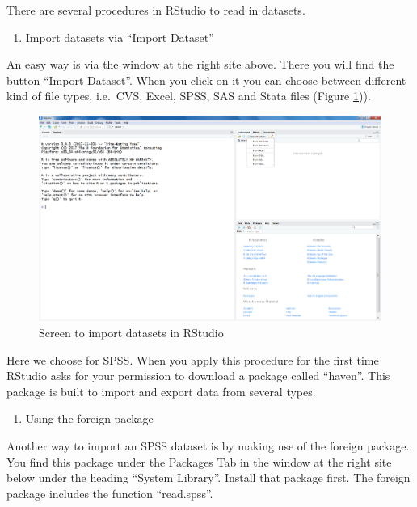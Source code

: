 \documentclass[]{book}
\providecommand{\tightlist}{%
  \setlength{\itemsep}{0pt}\setlength{\parskip}{0pt}}
\begin{document}
There are several procedures in RStudio to read in datasets.

\begin{enumerate}
\def\labelenumi{\arabic{enumi}.}
\tightlist
\item
  Import datasets via ``Import Dataset''
\end{enumerate}

An easy way is via the window at the right site above. There you will
find the button ``Import Dataset''. When you click on it you can choose
between different kind of file types, i.e.~CVS, Excel, SPSS, SAS and
Stata files (Figure \ref{fig:fig13})).

\begin{figure}

{\centering \includegraphics[width=0.95\linewidth]{images/fig1.13} 

}

\caption{Screen to import datasets in RStudio}\label{fig:fig13}
\end{figure}

Here we choose for SPSS. When you apply this procedure for the first
time RStudio asks for your permission to download a package called
``haven''. This package is built to import and export data from several
types.

\begin{enumerate}
\def\labelenumi{\arabic{enumi}.}
\setcounter{enumi}{1}
\tightlist
\item
  Using the foreign package
\end{enumerate}

Another way to import an SPSS dataset is by making use of the foreign
package. You find this package under the Packages Tab in the window at
the right site below under the heading ``System Library''. Install that
package first. The foreign package includes the function ``read.spss''.
\end{document}
